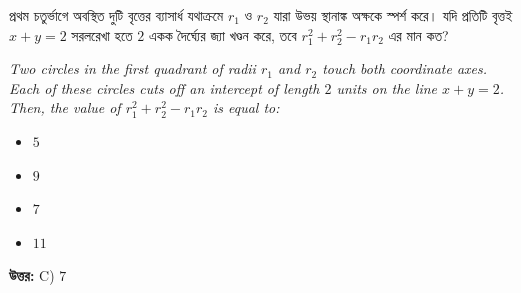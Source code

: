 \documentclass[12pt, a4paper]{article}
\begin{document}
\begin{tcolorbox}[questionbox={প্রশ্ন (Question) 17}]
    \noindent
    প্রথম চতুর্ভাগে অবস্থিত দুটি বৃত্তের ব্যাসার্ধ যথাক্রমে $r_1$ ও $r_2$ যারা উভয় স্থানাঙ্ক অক্ষকে স্পর্শ করে। যদি প্রতিটি বৃত্তই $x + y = 2$ সরলরেখা হতে $2$ একক দৈর্ঘ্যের জ্যা খণ্ডন করে, তবে $r_1^2 + r_2^2 - r_1 r_2$ এর মান কত?
    
    \vspace{0.8em}
    \begin{english}
    \noindent\textit{\color{darkgray}
    Two circles in the first quadrant of radii $r_1$ and $r_2$ touch both coordinate axes. Each of these circles cuts off an intercept of length $2$ units on the line $x + y = 2$. Then, the value of $r_1^2 + r_2^2 - r_1 r_2$ is equal to:
    }
    \end{english}
\end{tcolorbox}

\begin{itemize}[label={}, leftmargin=1cm, itemsep=0.5em]
    \item[\textbf{A)}] $5$
    \item[\textbf{B)}] $9$
    \item[\textbf{C)}] $7$
    \item[\textbf{D)}] $11$
\end{itemize}

\vspace{0.5em}
\begin{tcolorbox}[answerbox]
    \textbf{\color{success} উত্তর:} C) $7$
\end{tcolorbox}
\vspace{1em}
\end{document}
